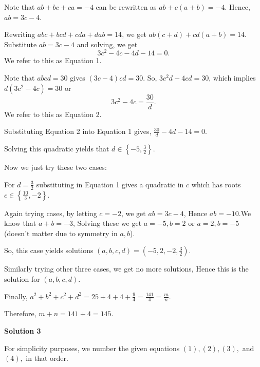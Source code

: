 \begin{enumerate}
Note that $ab + bc + ca = -4$ can be rewritten as $ab + c(a+b) = -4$. Hence, $ab = 3c - 4$.

 Rewriting $abc+bcd+cda+dab = 14$, we get $ab(c+d) + cd(a+b) = 14$. Substitute $ab = 3c - 4$ and solving, we get 
 \[3c^{2} - 4c - 4d - 14 = 0.\] We refer to this as Equation 1.

 Note that $abcd = 30$ gives $(3c-4)cd = 30$. So, $3c^{2}d - 4cd = 30$, which implies $d(3c^{2} - 4c) = 30$ or 
 \[3c^{2} - 4c = \frac{30}{d}.\] We refer to this as Equation 2.

 Substituting Equation 2 into Equation 1 gives, $\frac{30}{d} - 4d - 14 = 0$.

 Solving this quadratic yields that $d \in \left\{-5, \frac{3}{2}\right\}$.

 Now we just try these two cases:

 For $d = \frac{3}{2}$ substituting in Equation 1 gives a quadratic in $c$ which has roots $c \in \left\{\frac{10}{3}, -2\right\}$.

 Again trying cases, by letting $c = -2$, we get $ab = 3c-4$, Hence $ab = -10$.We know that $a + b = -3$, Solving these we get $a = -5, b = 2$ or $a= 2, b = -5$ (doesn't matter due to symmetry in $a,b$).

 So, this case yields solutions $(a,b,c,d) = \left(-5, 2 , -2, \frac{3}{2}\right)$.

 Similarly trying other three cases, we get no more solutions, Hence this is the solution for $(a,b,c,d)$.

 Finally, $a^{2} + b^{2} + c^{2} + d^{2} = 25 + 4 + 4 + \frac{9}{4} = \frac{141}{4} = \frac{m}{n}$.

 Therefore, $m + n = 141 + 4 = \boxed{145}$.

 



\textbf{Solution 3}

For simplicity purposes, we number the given equations $(1),(2),(3),$ and $(4),$ in that order.


\end{enumerate}
